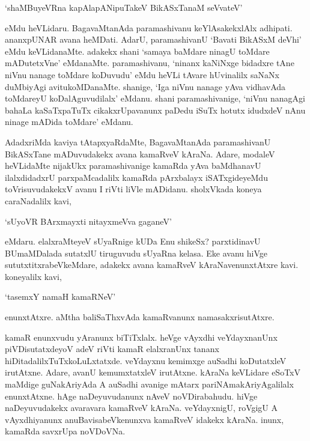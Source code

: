 \begin{shloka}
`shaMBuyeVRna kapAlapANipuTakeV BikASxTanaM seVvateV'
\end{shloka}

eMdu heVLidaru. BagavaMtanAda paramashivanu keYlAsakekxlAlx adhipati. ananxpUNAR avana heMDati. AdarU, paramashivanU `Bavati BikASxM deVhi' eMdu keVLidanaMte. adakekx shani `samaya baMdare ninagU toMdare mADutetxVne' eMdanaMte. paramashivanu, `ninanx kaNiNxge bidadxre tAne niVnu nanage toMdare koDuvudu' eMdu heVLi tAvare hUvinalilx saNaNx duMbiyAgi avitukoMDanaMte. shanige, `Iga niVnu nanage yAva vidhavAda toMdareyU koDalAguvudilalx' eMdanu. shani paramashivanige, `niVnu nanagAgi bahaLa kaSaTxpaTuTx cikakxrUpavanunx paDedu iSuTx hotutx idudxdeV nAnu ninage mADida toMdare' eMdanu.

AdadxriMda kaviya tAtapxyaRdaMte, BagavaMtanAda paramashivanU BikASxTane mADuvudakekx avana kamaRveV kAraNa. Adare, modaleV heVLidaMte nijakUkx paramashivanige kamaRda yAva baMdhanavU ilalxdidadxrU parxpaMcadalilx kamaRda pArxbalayx iSATxgideyeMdu toVrisuvudakekxV avanu I riVti liVle mADidanu. sholxVkada koneya caraNadalilx kavi,

\begin{shloka}
`sUyoVR BArxmayxti nitayxmeVva gaganeV'
\end{shloka}

eMdaru. elalxraMteyeV sUyaRnige kUDa Enu shikeSx? parxtidinavU BUmaMDalada sutatxlU tiruguvudu sUyaRna kelasa. Eke avanu hiVge sututxtitxrabeVkeMdare, adakekx avana kamaRveV kAraNavenunxtAtxre kavi. koneyalilx kavi,

\begin{shloka}
`tasemxY namaH kamaRNeV'
\end{shloka}

enunxtAtxre. aMtha baliSaThxvAda kamaRvanunx namasakxrisutAtxre.

kamaR enunxvudu yAranunx biTiTxlalx. heVge vAyxdhi veYdayxnanUnx piVDisutatxdeyoV adeV riVti kamaR elalxranUnx tananx hiDitadalilxTuTxkoLuLxtatxde. veYdayxnu kemimxge auSadhi koDutatxleV irutAtxne. Adare, avanU kemumxtatxleV irutAtxne. kAraNa keVLidare eSoTxV maMdige guNakAriyAda A auSadhi avanige mAtarx pariNAmakAriyAgalilalx enunxtAtxne. hAge naDeyuvudanunx nAveV noVDirabahudu. hiVge naDeyuvudakekx avaravara kamaRveV kAraNa. veYdayxnigU, roVgigU A vAyxdhiyanunx anuBavisabeVkenunxva kamaRveV idakekx kAraNa. inunx, kamaRda savxrUpa noVDoVNa.

